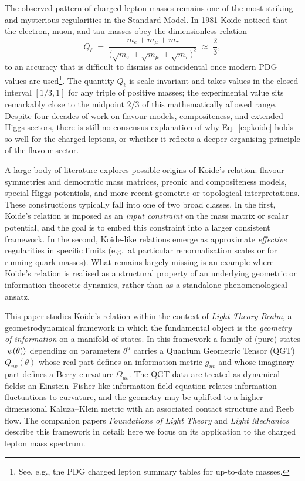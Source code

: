 \documentclass[12pt]{article}
\begin{document}
The observed pattern of charged lepton masses remains one of the most
striking and mysterious regularities in the Standard Model.
In 1981 Koide noticed that the electron, muon, and tau masses obey the
dimensionless relation
%
\begin{equation}
  Q_{\ell}
  \;=\;
  \frac{m_e + m_\mu + m_\tau}
       {\bigl(\sqrt{m_e} + \sqrt{m_\mu} + \sqrt{m_\tau}\bigr)^2}
  \;\approx\; \frac{2}{3},
  \label{eq:koide}
\end{equation}
%
to an accuracy that is difficult to dismiss as coincidental
once modern PDG values are used\footnote{See, e.g., the PDG charged lepton
summary tables for up-to-date masses.}.  The quantity $Q_\ell$ is scale
invariant and takes values in the closed interval $[1/3, 1]$ for any
triple of positive masses; the experimental value sits remarkably close
to the midpoint $2/3$ of this mathematically allowed range.
Despite four decades of work on flavour models, compositeness, and
extended Higgs sectors, there is still no consensus explanation of why
Eq.~\eqref{eq:koide} holds so well for the charged leptons, or whether
it reflects a deeper organising principle of the flavour sector.

A large body of literature explores possible origins of Koide's relation:
flavour symmetries and democratic mass matrices, preonic and compositeness
models, special Higgs potentials, and more recent geometric or
topological interpretations.
These constructions typically fall into one of two broad classes.
In the first, Koide's relation is imposed as an \emph{input constraint}
on the mass matrix or scalar potential, and the goal is to embed this
constraint into a larger consistent framework.
In the second, Koide-like relations emerge as approximate
\emph{effective} regularities in specific limits (e.g.\ at particular
renormalisation scales or for running quark masses).
What remains largely missing is an example where Koide's relation is
realised as a structural property of an underlying geometric or
information-theoretic dynamics, rather than as a standalone
phenomenological ansatz.

This paper studies Koide's relation within the context of
\emph{Light Theory Realm}, a geometrodynamical framework in which the
fundamental object is the \emph{geometry of information} on a manifold
of states.  In this framework a family of (pure) states
$\ket{\psi(\theta)}$ depending on parameters $\theta^u$ carries a
Quantum Geometric Tensor (QGT) $Q_{uv}(\theta)$ whose real part defines
an information metric $g_{uv}$ and whose imaginary part defines a Berry
curvature $\Omega_{uv}$.  The QGT data are treated as dynamical fields:
an Einstein--Fisher-like information field equation relates information
fluctuations to curvature, and the geometry may be uplifted to a
higher-dimensional Kaluza--Klein metric with an associated contact
structure and Reeb flow.  The companion papers
\emph{Foundations of Light Theory} and \emph{Light Mechanics} describe
this framework in detail; here we focus on its application to the charged lepton mass spectrum.
\end{document}
